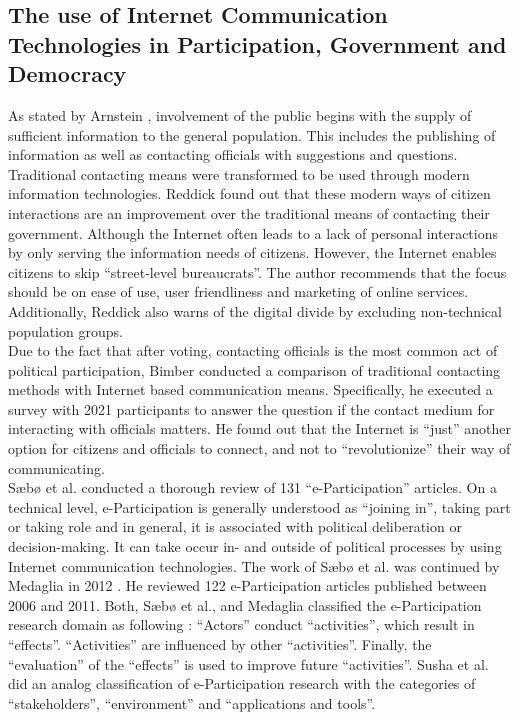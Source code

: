 \subsection{The use of Internet Communication Technologies in Participation, Government and Democracy}
As stated by Arnstein \cite{Arnstein1969_citizen_participation}, involvement of the public begins with the supply of sufficient information to the general population. This includes the publishing of information as well as contacting officials with suggestions and questions. Traditional contacting means were transformed to be used through modern information technologies. Reddick \cite{Reddick2005_Citizen_interaction_with_egovernment} found out that these modern ways of citizen interactions are an improvement over the traditional means of contacting their government. Although the Internet often leads to a lack of personal interactions by only serving the information needs of citizens. However, the Internet enables citizens to skip ``street-level bureaucrats''. The author recommends that the focus should be on ease of use, user friendliness and marketing of online services. Additionally, Reddick also warns of the digital divide by excluding non-technical population groups.\\
Due to the fact that after voting, contacting officials is the most common act of political participation, Bimber \cite{Bimber1999_Citizen_communication_with_government} conducted a comparison of traditional contacting methods with Internet based communication means. Specifically, he executed a survey with 2021 participants to answer the question if the contact medium for interacting with officials matters. He found out that the Internet is ``just'' another option for citizens and officials to connect, and not to ``revolutionize'' their way of communicating.\\
S{\ae}b{\o} et al. \cite{Saebo_eParticipation} conducted a thorough review of 131 ``e-Participation'' articles. On a technical level, e-Participation is generally understood as ``joining in'', taking part or taking role and in general, it is associated with political deliberation or decision-making. It can take occur in- and outside  of political processes by using Internet communication technologies. The work of S{\ae}b{\o} et al. was continued by Medaglia in 2012 \cite{Medaglia2012_eParticipation}. He reviewed 122 e-Participation articles published between 2006 and 2011. Both, S{\ae}b{\o} et al., and Medaglia classified the e-Participation research domain as following : ``Actors'' conduct ``activities'', which result in ``effects''. ``Activities'' are influenced by other ``activities''. Finally, the ``evaluation'' of the ``effects'' is used to improve future ``activities''. Susha et al. \cite{Susha2012_eParticipation} did an analog classification of e-Participation research with the categories of ``stakeholders'', ``environment'' and ``applications and tools''.\\
